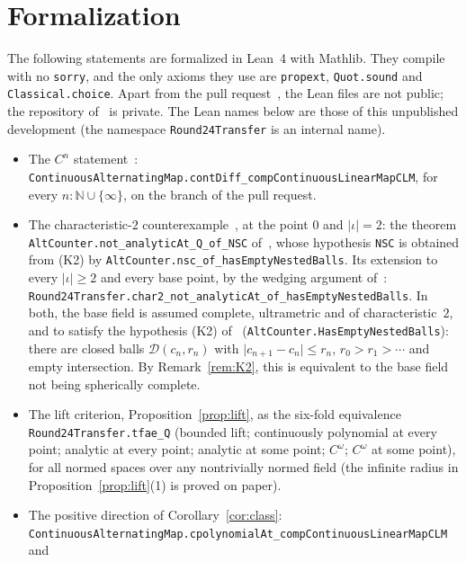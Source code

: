 \documentclass[11pt]{amsart}
\theoremstyle{definition}
\theoremstyle{remark}
\numberwithin{equation}{section}
\newcommand{\N}{\mathbb{N}}
\newcommand{\cD}{\mathcal{D}}
\newcommand{\abs}[1]{\lvert #1\rvert}
\begin{document}
\section{Formalization}\label{sec:lean}
The following statements are formalized in Lean~4 with Mathlib. They compile with no \texttt{sorry}, and the only
axioms they use are \texttt{propext}, \texttt{Quot.\allowbreak{}sound} and \texttt{Classical.\allowbreak{}choice}. Apart from the
pull request~\cite{PR}, the Lean files are not public; the repository of~\cite{M} is private. The Lean names below are
those of this unpublished development (the namespace \texttt{Round24Transfer} is an internal name).
\begin{itemize}\raggedright
\item The $C^n$ statement~\cite{PR}: \texttt{ContinuousAlternatingMap.\allowbreak{}contDiff\_\allowbreak{}compContinuousLinearMapCLM}, for every
$n:\N\cup\{\infty\}$, on the branch of the pull request.
\item The characteristic-$2$ counterexample~\cite{M}, at the point $0$ and $\abs\iota=2$: the theorem
\texttt{AltCounter.\allowbreak{}not\_\allowbreak{}analyticAt\_\allowbreak{}Q\_\allowbreak{}of\_\allowbreak{}NSC} of~\cite{M}, whose hypothesis
\texttt{NSC} is obtained from (K2) by \texttt{AltCounter.\allowbreak{}nsc\_\allowbreak{}of\_\allowbreak{}hasEmptyNestedBalls}. Its extension
to every $\abs\iota\ge2$ and every base point, by the wedging argument of~\cite[Remark~18]{M}:
\texttt{Round24Transfer.\allowbreak{}char2\_\allowbreak{}not\_\allowbreak{}analyticAt\_\allowbreak{}of\_\allowbreak{}hasEmptyNestedBalls}. In both, the base
field is assumed complete, ultrametric and of characteristic~$2$, and to satisfy the hypothesis (K2) of~\cite{M}
(\texttt{AltCounter.\allowbreak{}HasEmptyNestedBalls}): there are closed balls $\cD(c_n,r_n)$ with $\abs{c_{n+1}-c_n}\le r_n$,
$r_0>r_1>\cdots$ and empty intersection. By Remark~\ref{rem:K2}, this is equivalent to the base field not being
spherically complete.
\item The lift criterion, Proposition~\ref{prop:lift}, as the six-fold equivalence \texttt{Round24Transfer.\allowbreak{}tfae\_\allowbreak{}Q}
(bounded lift; continuously polynomial at every point; analytic at every point; analytic at some point; $C^\omega$;
$C^\omega$ at some point), for all normed spaces over any nontrivially normed field (the infinite radius in
Proposition~\ref{prop:lift}(1) is proved on paper).
\item The positive direction of Corollary~\ref{cor:class}:
\texttt{ContinuousAlternatingMap.\allowbreak{}cpolynomialAt\_\allowbreak{}compContinuousLinearMapCLM} and

\end{itemize}
\end{document}
